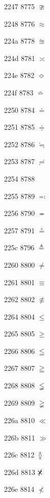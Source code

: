 \documentclass[11pt]{article}
\begin{document}
2247 8775 \ensuremath{\ncong}

2248 8776 \ensuremath{\approx}


224a 8778 \ensuremath{\approxeq}



224d 8781 \ensuremath{\asymp}

224e 8782 \ensuremath{\Bumpeq}

224f 8783 \ensuremath{\bumpeq}

2250 8784 \ensuremath{\doteq}

2251 8785 \ensuremath{\doteqdot}

2252 8786 \ensuremath{\fallingdotseq}

2253 8787 \ensuremath{\risingdotseq}

2254 8788 \coloneq

2255 8789 \ensuremath{\eqcolon}

2256 8790 \ensuremath{\eqcirc}

2257 8791 \ensuremath{\circeq}




225c 8796 \ensuremath{\triangleq}


2260 8800 \ensuremath{\ne}

2261 8801 \ensuremath{\equiv}

2262 8802 \ensuremath{\nequiv}

2264 8804 \ensuremath{\leq}

2265 8805 \ensuremath{\geq}

2266 8806 \ensuremath{\leqq}

2267 8807 \ensuremath{\geqq}

2268 8808 \ensuremath{\lneqq}

2269 8809 \ensuremath{\gneqq}

226a 8810 \ensuremath{\ll}

226b 8811 \ensuremath{\gg}

226c 8812 \ensuremath{\between}

226d 8813 \ensuremath{\not\kern-0.3em\times}

226e 8814 \ensuremath{\nless}
\end{document}
